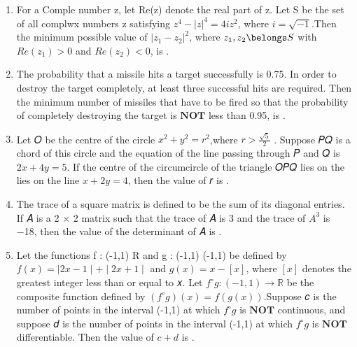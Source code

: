 \documentclass{article}
\begin{document}

\begin{enumerate}
\item For a Comple number z, let Re(z) denote the real part of z. Let S be the set of all complwx numbers z satisfying $z^4 - |z|^4 = 4iz^2$, where $i = \sqrt{-1}$.Then the minimum possible value of $|z_1 - z_2|^2$, where $z_1,z_2 \belongs S$ with $Re(z_1)>0$ and $Re(z_2)<0$, is \underline{\hspace{2cm}}.

\item The probability that a missile hits a target successfully is 0.75. In order to destroy the target 
completely, at least three successful hits are required. Then the minimum number of missiles that
have to be fired so that the probability of completely destroying the target is $\textbf{NOT}$ less than 0.95, is \underline{\hspace{2cm}}.

\item Let 𝑂 be the centre of the circle $x^2 + y^2 = r^2$,where $r>\frac{\sqrt{5}}{2}$
. Suppose 𝑃𝑄 is a chord of this circle
and the equation of the line passing through 𝑃 and 𝑄 is $2x + 4y = 5$. If the centre of the 
circumcircle of the triangle 𝑂𝑃𝑄 lies on the lies on the line $x + 2y = 4$, then the value of 𝑟 is \underline{\hspace{2cm}}.

\item The trace of a square matrix is defined to be the sum of its diagonal entries. If 𝐴 is a 2 × 2 matrix 
such that the trace of 𝐴 is 3 and the trace of $A^3$
is −18, then the value of the determinant of 𝐴 is \underline{\hspace{2cm}}.

\item Let the functions f : (-1,1) \to R and g : (-1,1) \to (-1,1) be defined by
 $f(x) = \mid2x - 1\mid + \mid2x + 1\mid$ and $g(x) = x - [x]$,
where $[x]$ denotes the greatest integer less than or equal to 𝑥. Let $f ^\circ g: (-1,1) \to ℝ$ be the composite function defined by $(f ^\circ g)(𝑥) = f(g(x))$.Suppose 𝑐 is the number of points in the 
interval (-1,1) at which $f ^\circ g$ is $\textbf {NOT}$ continuous, and suppose 𝑑 is the number of points in the interval (-1,1) at which $f ^\circ g$ is $\textbf{NOT}$ differentiable. Then the value of $𝑐 + 𝑑$ is \underline{\hspace{2cm}}.


\end{enumerate}
\end{document}
